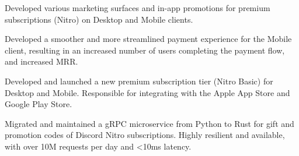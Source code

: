 \documentclass[a4paper]{deedy-resume-openfont} %
\begin{document}
\begin{tightemize}
\item Developed various marketing surfaces and in-app promotions for premium subscriptions (Nitro) on Desktop and Mobile clients.
\item Developed a smoother and more streamlined payment experience for the Mobile client, resulting in an increased number of users completing the payment flow, and increased MRR.
\item Developed and launched a new premium subscription tier (Nitro Basic) for Desktop and Mobile. Responsible for integrating with the Apple App Store and Google Play Store. 
\item Migrated and maintained a gRPC microservice from Python to Rust for gift and promotion codes of Discord Nitro subscriptions. Highly resilient and available, with over 10M requests per day and <10ms latency.
\end{tightemize}

\sectionsep %

\end{document}
